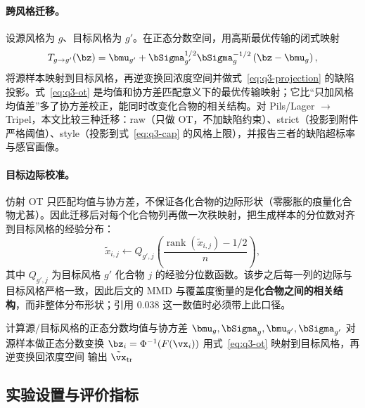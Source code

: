 \paragraph{跨风格迁移。}设源风格为 $g$、目标风格为 $g'$。在正态分数空间，用高斯最优传输的闭式映射
\begin{equation}
  T_{g\to g'}(\bz)=\bmu_{g'}+\bSigma_{g'}^{1/2}\bSigma_g^{-1/2}\left(\bz-\bmu_g\right),
  \label{eq:q3-ot}
\end{equation}
将源样本映射到目标风格，再逆变换回浓度空间并做式~\eqref{eq:q3-projection} 的缺陷投影。式~\eqref{eq:q3-ot} 是均值和协方差匹配意义下的最优传输映射；它比“只加风格均值差”多了协方差校正，能同时改变化合物的相关结构。对 Pils/Lager $\to$ Tripel，本文比较三种迁移：raw（只做 OT，不加缺陷约束）、strict（投影到附件严格阈值）、style（投影到式~\eqref{eq:q3-cap} 的风格上限），并报告三者的缺陷超标率与感官画像。

\paragraph{目标边际校准。}仿射 OT 只匹配均值与协方差，不保证各化合物的边际形状（零膨胀的痕量化合物尤甚）。因此迁移后对每个化合物列再做一次秩映射，把生成样本的分位数对齐到目标风格的经验分布：
\begin{equation}
  \tilde{x}_{i,j}\leftarrow Q_{g',j}\!\left(\frac{\operatorname{rank}(\tilde{x}_{i,j})-1/2}{n}\right),
  \label{eq:q3-rank}
\end{equation}
其中 $Q_{g',j}$ 为目标风格 $g'$ 化合物 $j$ 的经验分位数函数。该步之后每一列的边际与目标风格严格一致，因此后文的 MMD 与覆盖度衡量的是\textbf{化合物之间的相关结构}，而非整体分布形状；引用 $0.038$ 这一数值时必须带上此口径。

\begin{algorithm}[htbp]
  \small
  \caption{缺陷约束的最优传输风格迁移}
  \label{alg:transfer}
  计算源/目标风格的正态分数均值与协方差 $\bmu_g,\bSigma_g,\bmu_{g'},\bSigma_{g'}$\;
  对源样本做正态分数变换 $\bz_i=\Phi^{-1}(F(\vx_i))$\;
  用式~\eqref{eq:q3-ot} 映射到目标风格，再逆变换回浓度空间\;
  输出 $\tilde{\vx}_{\mathrm{tr}}$\;
\end{algorithm}

\subsection{实验设置与评价指标}

